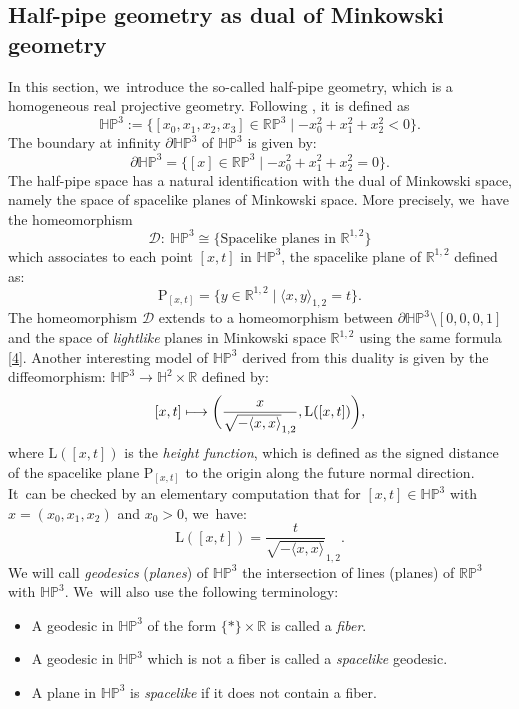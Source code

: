 \documentclass[10pt]{amsart}
\newcommand\mto{\mathchoice{\longmapsto}{\mapsto}{\mapsto}{\mapsto}}
\theoremstyle{plain}
\theoremstyle{definition}
\newcommand{\minko}{\mathbb{R}^{1,2}}
\newcommand{\HP}{\mathbb{HP}^3}
\let\Subsection\subsection\let\Subsubsection\subsubsection
\begin{document}
\Subsection{Half-pipe geometry as dual of Minkowski geometry}
In this section, we~introduce the so-called half-pipe geometry, which is a homogeneous real projective geometry. Following
\cite{danciger_thesis}, it is defined as
\[
\HP :=\{[x_0,x_1,x_2,x_3]\in\mathbb{RP}^3\mid -x_0^2+x_1^2+x_2^2<0\}.
\]
The boundary at infinity $\partial\HP$ of $\HP$ is given by:
\[
\partial\HP=\{[x]\in \mathbb{RP}^3\mid -x_0^2+x_1^2+x_2^2=0\}.
\]The half-pipe space has a natural identification with the dual of Minkowski space, namely the space of spacelike planes of Minkowski space. More precisely, we~have the homeomorphism
\begin{equation}\label{hpminko}
\mathcal{D}:\ \HP\cong \{\text{Spacelike planes in } \minko\}
\end{equation}
which associates to each point $[x,t]$ in $\HP$, the spacelike plane of $\minko$ defined as:
\begin{equation}\label{4}
\mathrm{P}_{[x,t]}=\{ y \in \minko \mid \langle x,y \rangle_{1,2} = t \}.
\end{equation}
The homeomorphism $\mathcal{D}$ extends to a homeomorphism between $\partial\HP\setminus[0,0,0,1]$ and the space of \emph{lightlike} planes in Minkowski space $\minko$ using the same formula \eqref{4}. Another interesting model of $\HP$ derived from this duality is given by the diffeomorphism: $\HP\to\mathbb{H}^2\times\mathbb{R}$ defined by:
\begin{equation}\label{L}
[x,t]\mto\biggl(\frac{x}{\sqrt{-\langle x,x\rangle}_{1,2}},\mathrm{L}([x,t])\biggr),
\end{equation}
where $\mathrm{L}([x,t])$ is the \emph{height function}, which is defined as the signed distance of the spacelike plane $\mathrm{P}_{[x,t]}$ to the origin along the future normal direction. It~can be checked by an elementary computation that for \([x,t] \in \HP\) with \(x = (x_0, x_1, x_2)\) and \(x_0 > 0\), we~have: \begin{equation}\label{formule_L}
\mathrm{L}([x,t])=\frac{t}{\sqrt{-\langle x,x\rangle}}_{1,2}.
\end{equation}
We will call \emph{geodesics} (\resp \emph{planes}) of $\HP$ the intersection of lines (\resp planes) of $\mathbb{RP}^3$ with $\HP$. We~will also use the following terminology:
\begin{itemize}
\item A geodesic in $\HP$ of the form $\{*\}\times \mathbb{R}$ is called a \emph{fiber}.
\item A geodesic in $\HP$ which is not a fiber is called a \emph{spacelike} geodesic.
\item A plane in $\HP$ is \emph{spacelike} if it does not contain a fiber.
\end{itemize}
\end{document}
